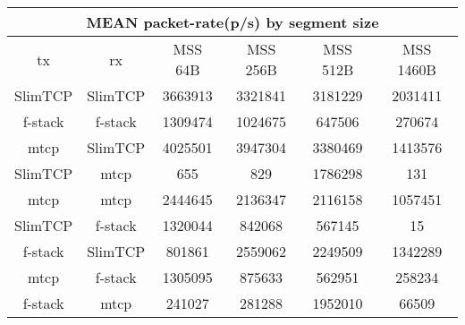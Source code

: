 
\begin{center}
\begin{tabular}{ c c c c c c }
\multicolumn{6}{c}{MEAN packet-rate(p/s) by segment size} \\
\hline
tx & rx & MSS 64B & MSS 256B & MSS 512B & MSS 1460B \\
SlimTCP & SlimTCP & 3663913 & 3321841 & 3181229 & 2031411 \\
f-stack & f-stack & 1309474 & 1024675 & 647506 & 270674 \\
mtcp & SlimTCP & 4025501 & 3947304 & 3380469 & 1413576 \\
SlimTCP & mtcp & 655 & 829 & 1786298 & 131 \\
mtcp & mtcp & 2444645 & 2136347 & 2116158 & 1057451 \\
SlimTCP & f-stack & 1320044 & 842068 & 567145 & 15 \\
f-stack & SlimTCP & 801861 & 2559062 & 2249509 & 1342289 \\
mtcp & f-stack & 1305095 & 875633 & 562951 & 258234 \\
f-stack & mtcp & 241027 & 281288 & 1952010 & 66509 \\

\end{tabular}
\end{center}

